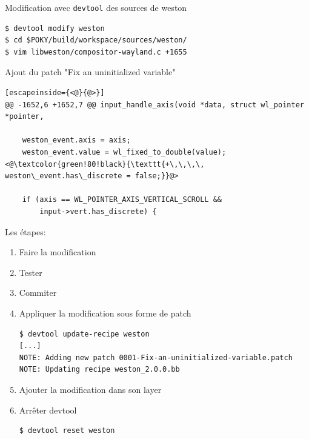 \documentclass[compress]{smilebeamer}
\begin{document}
\begin{frame}[fragile]
Modification avec \texttt{devtool} des sources de weston
\begin{lstlisting}[style=shell]
$ devtool modify weston
$ cd $POKY/build/workspace/sources/weston/
$ vim libweston/compositor-wayland.c +1655
\end{lstlisting}

Ajout du patch "Fix an uninitialized variable"
\begin{lstlisting}[escapeinside={<@}{@>}]
@@ -1652,6 +1652,7 @@ input_handle_axis(void *data, struct wl_pointer *pointer,
 
 	weston_event.axis = axis;
 	weston_event.value = wl_fixed_to_double(value);
<@\textcolor{green!80!black}{\texttt{+\,\,\,\, weston\_event.has\_discrete = false;}}@>
 
 	if (axis == WL_POINTER_AXIS_VERTICAL_SCROLL &&
 	    input->vert.has_discrete) {
\end{lstlisting}
\end{frame}

\begin{frame}[fragile]
Les étapes:
\begin{enumerate}
\item Faire la modification
\item Tester
\item Commiter
\item Appliquer la modification sous forme de patch
\begin{lstlisting}[style=shell]
$ devtool update-recipe weston
[...]
NOTE: Adding new patch 0001-Fix-an-uninitialized-variable.patch
NOTE: Updating recipe weston_2.0.0.bb
\end{lstlisting}
\item Ajouter la modification dans son layer
\item Arrêter devtool
\begin{lstlisting}[style=shell]
$ devtool reset weston
\end{lstlisting}
\end{enumerate}
\end{frame}



\end{document}
